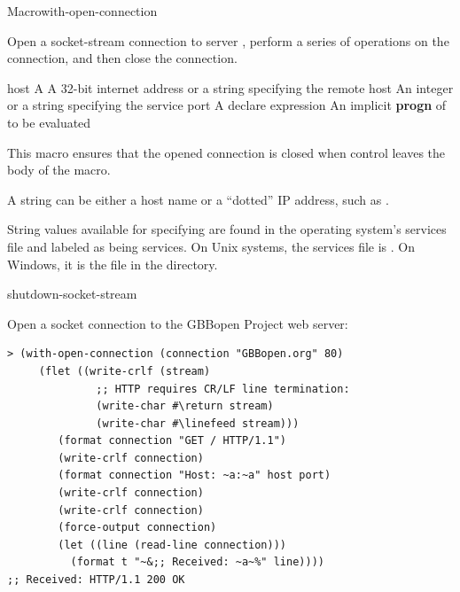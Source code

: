 \documentclass[10pt,twoside,english,pdftex]{article}
\begin{document}

\begin{functiondoc}{Macro}{with-open-connection}%
  {\code{(}\code{)}
    \superstar{}
    \superstar{}}
%
%
%

\fnsyntax

\fnpurpose Open a socket-stream connection to server ,
perform a series of operations on the connection, and then close the
connection.

\fnpackage {}

\fnmodule {}

\fnargs
\begin{args}{host}
\arg[var] A 
\arg[host] A 32-bit internet address or a string specifying the remote host
\arg[port] An integer or a string specifying the service port
\arg[declaration] A declare expression
\arg[forms] An implicit \textbf{progn} of  to be evaluated
\end{args}

\fndescription This macro ensures that the opened connection is closed when
control leaves the body of the macro.

A  string can be either a host name or a ``dotted'' IP address,
such as .

String values available for specifying  are found in the operating
system's services file and labeled as being  services. On Unix
systems, the services file is . On Windows, it is the file
 in the  directory.

\begin{alsos}{shutdown-socket-stream}
\end{alsos}

\fnexample
Open a socket connection to the GBBopen Project web server:
\begin{verbatim}
> (with-open-connection (connection "GBBopen.org" 80)
     (flet ((write-crlf (stream)
              ;; HTTP requires CR/LF line termination: 
              (write-char #\return stream)
              (write-char #\linefeed stream)))
        (format connection "GET / HTTP/1.1")
        (write-crlf connection)
        (format connection "Host: ~a:~a" host port)
        (write-crlf connection)
        (write-crlf connection)
        (force-output connection)
        (let ((line (read-line connection)))
          (format t "~&;; Received: ~a~%" line))))
;; Received: HTTP/1.1 200 OK
\end{verbatim}

\end{functiondoc}
\end{document}
